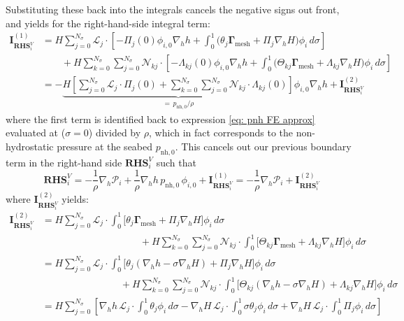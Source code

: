 \documentclass{article}
\newcommand{\Ns}{N_\sigma}
\newcommand{\sumj}{\sum_{j=0}^{\Ns}}
\newcommand{\sumk}{\sum_{k=0}^{\Ns}}
\newcommand{\nablah}{\nabla_h}
\newcommand{\pnhbottom}{p_{\text{nh},0}}
\newcommand{\Gam}{\boldsymbol{\Gamma}_{\text{mesh}}}
\newcommand{\Pcol}{\mathcal{P}_i}
\begin{document}
\begin{itemize}
    Substituting these back into the integrals cancels the negative signs out front, and yields for the right-hand-side integral term:
    \begin{align*}
        \mathbf{I}_{\mathbf{RHS}_i^V}^{(1)}  &= H \sumj \mathcal{L}_j \cdot \left[- \Pi_j(0)\phi_{i,0}\nablah h + \int_0^1  \big(\theta_j\Gam + \Pi_j\nablah H\big)\phi_i\,d\sigma \right] \\
        &\qquad+ H \sumk \sumj \mathcal{N}_{kj} \cdot \left[ - \Lambda_{kj}(0)\phi_{i,0}\nablah h + \int_0^1 \big(\Theta_{kj}\Gam + \Lambda_{kj}\nablah H\big)\phi_i\,d\sigma\right]  \\
        &= - \underbrace{H \left[\sumj \mathcal{L}_j \cdot  \Pi_j(0) + \sumk \sumj \mathcal{N}_{kj} \cdot \Lambda_{kj}(0) \right]}_{= \,\pnhbottom / \rho}\phi_{i,0}\nablah h + \mathbf{I}_{\mathbf{RHS}_i^V}^{(2)}
    \end{align*}
    where the first term is identified back to expression \eqref{eq: pnh FE approx} evaluated at ($\sigma=0$) divided by $\rho$, which in fact corresponds to the non-hydrostatic pressure at the seabed $\pnhbottom$.  
    This cancels out our previous boundary term in the right-hand side $\mathbf{RHS}_i^V$ such that
    $$\mathbf{RHS}_i^V = -\frac{1}{\rho}\nablah\Pcol + \frac{1}{\rho}\nablah h \,\pnhbottom \,\phi_{i,0} + \mathbf{I}_{\mathbf{RHS}_i^V}^{(1)} = -\frac{1}{\rho}\nablah\Pcol + \mathbf{I}_{\mathbf{RHS}_i^V}^{(2)}$$
    where $\mathbf{I}_{\mathbf{RHS}_i^V}^{(2)}$ yields:
    \begin{align*}
        \mathbf{I}_{\mathbf{RHS}_i^V}^{(2)} &= H \sumj \mathcal{L}_j \cdot \int_0^1 \Big[\theta_j\Gam + \Pi_j\nablah H\Big]\phi_i \, d\sigma \\
        &\qquad\qquad\qquad\qquad\qquad+ H \sumk \sumj \mathcal{N}_{kj} \cdot \int_0^1 \Big[\Theta_{kj}\Gam + \Lambda_{kj}\nablah H \Big]\phi_i\, d\sigma  \\
        &= H \sumj \mathcal{L}_j \cdot \int_0^1 \Big[\theta_j\left(\nablah h - \sigma \nablah H\right) + \Pi_j\nablah H\Big]\phi_i \, d\sigma \\
        &\qquad\qquad\qquad\qquad + H \sumk \sumj \mathcal{N}_{kj} \cdot \int_0^1 \Big[\Theta_{kj}\left(\nablah h - \sigma \nablah H\right) + \Lambda_{kj}\nablah H \Big]\phi_i\, d\sigma \\
        &= H \sumj \left[ \nablah h\,\mathcal{L}_j \cdot \int_0^1 \theta_j\phi_i \, d\sigma 
        - \nablah H\, \mathcal{L}_j \cdot \int_0^1 \sigma \theta_j \phi_i \, d\sigma 
        + \nablah H\, \mathcal{L}_j \cdot \int_0^1 \Pi_j \phi_i \, d\sigma\right] \\

\end{align*}
\end{itemize}
\end{document}
